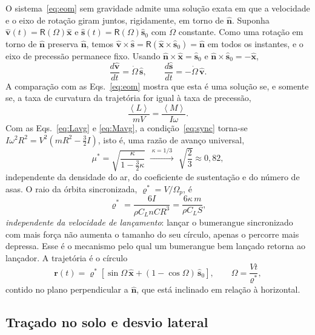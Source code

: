 \documentclass[aps,pre,twocolumn,superscriptaddress,nofootinbib,floatfix]{revtex4-2}
\newcommand{\vect}[1]{\bm{#1}}
\newcommand{\uv}[1]{\hat{\bm{#1}}}
\newcommand{\avg}[1]{\left\langle #1 \right\rangle}
\begin{document}
O sistema~\eqref{eq:eom} sem gravidade admite uma solução exata em que a velocidade e o eixo de rotação giram juntos, rigidamente, em torno de $\uv n$. Suponha $\uv v(t)=\mathsf R(\Omega)\uv x$ e $\uv s(t)=\mathsf R(\Omega)\uv s_0$ com $\dot\Omega$ constante. Como uma rotação em torno de $\uv n$ preserva $\uv n$, temos $\uv v\times\uv s=\mathsf R(\uv x\times\uv s_0)=\uv n$ em todos os instantes, e o eixo de precessão permanece fixo. Usando $\uv n\times\uv x=\uv s_0$ e $\uv n\times\uv s_0=-\uv x$,
\begin{equation}
  \frac{d\uv v}{dt} = \dot\Omega\,\uv s, \qquad \frac{d\uv s}{dt} = -\dot\Omega\,\uv v .
\end{equation}
A comparação com as Eqs.~\eqref{eq:eom} mostra que esta é uma solução se, e somente se, a taxa de curvatura da trajetória for igual à taxa de precessão,
\begin{equation}
  \frac{\avg{L}}{mV} = \frac{\avg{M}}{I\omega}.
  \label{eq:sync}
\end{equation}
Com as Eqs.~\eqref{eq:Lavg} e \eqref{eq:Mavg}, a condição~\eqref{eq:sync} torna-se $I\omega^2R^2 = V^2\left(mR^2-\tfrac32 I\right)$, isto é, uma razão de avanço universal,
\begin{equation}
  \mu^\ast = \sqrt{\frac{\kappa}{1-\tfrac32\kappa}}
  \;\xrightarrow{\;\kappa=1/3\;}\; \sqrt{\frac23}\approx 0{,}82 ,
  \label{eq:mustar}
\end{equation}
independente da densidade do ar, do coeficiente de sustentação e do número de asas. O raio da órbita sincronizada, $\varrho^\ast=V/\Omega_p$, é
\begin{equation}
  \varrho^\ast = \frac{6I}{\rho C_L nCR^3} = \frac{6\kappa\,m}{\rho C_L S},
  \label{eq:rhostar}
\end{equation}
\emph{independente da velocidade de lançamento}: lançar o bumerangue sincronizado com mais força não aumenta o tamanho do seu círculo, apenas o percorre mais depressa. Esse é o mecanismo pelo qual um bumerangue bem lançado retorna ao lançador. A trajetória é o círculo
\begin{equation}
  \vect r(t) = \varrho^\ast\left[\sin\Omega\,\uv x + (1-\cos\Omega)\,\uv s_0\right], \qquad \Omega = \frac{Vt}{\varrho^\ast},
  \label{eq:circle}
\end{equation}
contido no plano perpendicular a $\uv n$, que está inclinado em relação à horizontal.

\subsection{Traçado no solo e desvio lateral}
\end{document}
